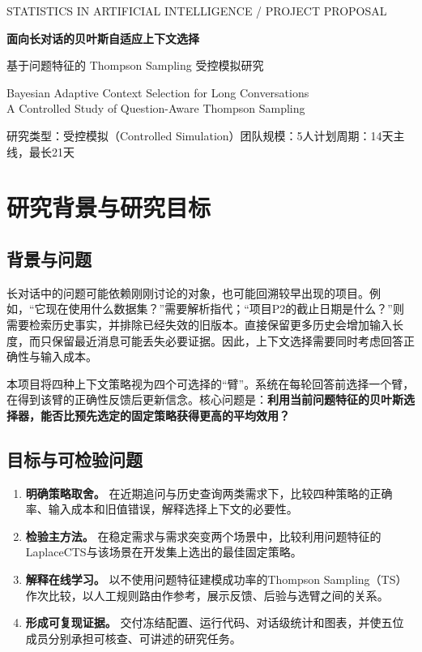 \documentclass[11pt,a4paper]{article}
\newcommand{\note}[1]{{\small\color{muted}#1\par}}
\begin{document}
{\small\sffamily\color{accent}STATISTICS IN ARTIFICIAL INTELLIGENCE / PROJECT PROPOSAL}\par
\vspace{5pt}
{\LARGE\sffamily\bfseries\color{ink}面向长对话的贝叶斯自适应上下文选择}\par
{\large\sffamily 基于问题特征的 Thompson Sampling 受控模拟研究}\par
{\normalsize Bayesian Adaptive Context Selection for Long Conversations\\
A Controlled Study of Question-Aware Thompson Sampling}\par
\note{研究类型：受控模拟（Controlled Simulation）\quad 团队规模：5人\quad 计划周期：14天主线，最长21天}
\vspace{3pt}
\section{研究背景与研究目标}
\subsection{背景与问题}
长对话中的问题可能依赖刚刚讨论的对象，也可能回溯较早出现的项目。例如，“它现在使用什么数据集？”需要解析指代；“项目P2的截止日期是什么？”则需要检索历史事实，并排除已经失效的旧版本。直接保留更多历史会增加输入长度，而只保留最近消息可能丢失必要证据。因此，上下文选择需要同时考虑回答正确性与输入成本。

本项目将四种上下文策略视为四个可选择的“臂”。系统在每轮回答前选择一个臂，在得到该臂的正确性反馈后更新信念。核心问题是：\textbf{利用当前问题特征的贝叶斯选择器，能否比预先选定的固定策略获得更高的平均效用？}

\subsection{目标与可检验问题}
\begin{enumerate}
\item \textbf{明确策略取舍。} 在近期追问与历史查询两类需求下，比较四种策略的正确率、输入成本和旧值错误，解释选择上下文的必要性。
\item \textbf{检验主方法。} 在稳定需求与需求突变两个场景中，比较利用问题特征的LaplaceCTS与该场景在开发集上选出的最佳固定策略。
\item \textbf{解释在线学习。} 以不使用问题特征建模成功率的Thompson Sampling（TS）作次比较，以人工规则路由作参考，展示反馈、后验与选臂之间的关系。
\item \textbf{形成可复现证据。} 交付冻结配置、运行代码、对话级统计和图表，并使五位成员分别承担可核查、可讲述的研究任务。
\end{enumerate}
\end{document}
